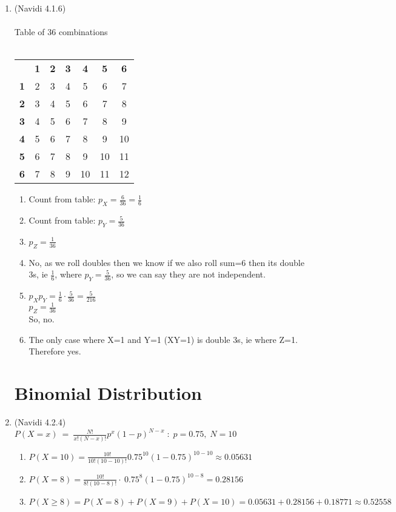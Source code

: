 \documentclass[11pt]{article}
\begin{document}
\begin{preview}
\begin{enumerate}
\item  (Navidi 4.1.6) \\ \\
Table of 36 combinations \\ \\
\begin{tabular}{ccccccc}
        & \textbf{1} & \textbf{2} & \textbf{3} & \textbf{4} & \textbf{5} & \textbf{6} \\
\textbf{1} & 2          & 3          & 4          & 5          & 6          & 7          \\
\textbf{2} & 3          & 4          & 5          & 6          & 7          & 8          \\
\textbf{3} & 4          & 5          & 6          & 7          & 8          & 9          \\
\textbf{4} & 5          & 6          & 7          & 8          & 9          & 10         \\
\textbf{5} & 6          & 7          & 8          & 9          & 10         & 11         \\
\textbf{6} & 7          & 8          & 9          & 10         & 11         & 12        
\end{tabular} 
\begin{enumerate}
        \item Count from table: $p_X=\frac{6}{36} = \frac{1}{6}$
        \item Count from table: $p_Y=\frac{5}{36}$
        \item $p_Z=\frac{1}{36}$
        \item No, as we roll doubles then we know if we also roll sum=6 then its double 3s, ie $\frac{1}{6}$, where $p_Y=\frac{5}{36}$, so we can say they are not independent.
        \item $p_{X}p_{Y}=\frac{1}{6}\cdot\frac{5}{36}=\frac{5}{216}$\\
        $p_Z=\frac{1}{36}$ \\
        So, no.
        \item The only case where X=1 and Y=1 (XY=1) is double 3s, ie where Z=1. Therefore yes.
\end{enumerate}

\section*{Binomial Distribution}
\item  (Navidi 4.2.4) \\
$P\left(X=x\right)\:=\:\frac{N!}{x!\left(N-x\right)!}p^x\left(1-p\right)^{N-x} \; : \; p=0.75, \; N=10$
\begin{enumerate}
        \item $P(X=10)=\frac{10!}{10!\left(10-10\right)!}0.75^{10}\left(1-0.75\right)^{10-10} \approx 0.05631 $
        \item $P(X=8) = \frac{10!}{8!\left(10-8\right)!}\cdot \:0.75^8\left(1-0.75\right)^{10-8}=0.28156$
        \item $P(X \ge 8) = P(X=8)+P(X=9)+P(X=10) = 0.05631 + 0.28156 + 0.18771 \approx 0.52558$
\end{enumerate}


\end{enumerate}
\end{preview}
\end{document}
